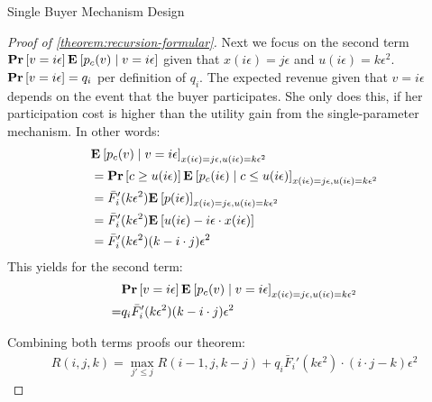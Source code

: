 \documentclass[11pt,a4paper]{article}
\renewcommand{\Pr}[1]{\mbox{\rm\bf Pr}\left[#1\right]}
\newcommand{\Ex}[2][]{\mbox{\rm\bf E}_{#1}\left[#2\right]}
\newcommand{\1}[1]{\mbox{\rm\bf 1}_{#1}}
\begin{document}
\begin{section}{Single Buyer Mechanism Design}
\begin{proof}[Proof of \autoref{theorem:recursion-formular}]
     Next we focus on the second term $\Pr{v = i \epsilon} \Ex{p_c(v) \mid v = i \epsilon}$ given that $x(i\epsilon) = j\epsilon$ and $u(i\epsilon) = k\epsilon^2$.
     $\Pr{v = i \epsilon} = q_i$ per definition of $q_i$.
     The expected revenue given that $v = i \epsilon$ depends on the event that the buyer participates.
     She only does this, if her participation cost is higher than the utility gain from the single-parameter mechanism.
     In other words:
     \begin{align*}
          & \Ex{p_c(v) \mid v = i \epsilon}_{x(i\epsilon) = j \epsilon, u(i\epsilon) = k\epsilon^2}                                         \\
          & = \Pr{c \geq u(i\epsilon)} \Ex{p_c(i\epsilon) \mid c \leq u(i\epsilon)}_{x(i\epsilon) = j \epsilon, u(i\epsilon) = k\epsilon^2} \\
          & = \bar{F}_i'(k\epsilon^2) \Ex{p(i\epsilon)}_{x(i\epsilon) = j \epsilon, u(i\epsilon) = k\epsilon^2}                             \\
          & = \bar{F}_i'(k\epsilon^2) \Ex{u(i\epsilon) - i\epsilon \cdot x(i\epsilon)}                                                      \\
          & = \bar{F}_i'(k\epsilon^2) (k - i \cdot j)\epsilon^2                                                                             \\
     \end{align*}
     This yields for the second term:
     \begin{align*}
           & \Pr{v = i \epsilon} \Ex{p_c(v) \mid v = i \epsilon}_{x(i\epsilon) = j \epsilon, u(i\epsilon) = k\epsilon^2} \\
         = & q_i \bar{F}_i'(k\epsilon^2) (k - i \cdot j)\epsilon^2
     \end{align*}

     Combining both terms proofs our theorem:
     \begin{align*}
         R(i,j,k) = \max_{j' \leq j} R(i-1, j, k - j) + q_i \bar{F}_i'(k \epsilon^2) \cdot (i\cdot j - k)\epsilon^2
     \end{align*}
 \end{proof}


\end{section}
\end{document}
